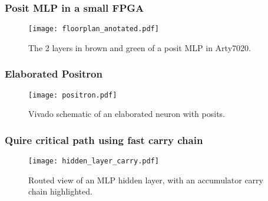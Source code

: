 \begin{frame}
    \frametitle{Posit MLP in a small FPGA}
    \begin{figure}[H]
        \centering
        \texttt{[image: floorplan\_anotated.pdf]}
        \caption{The 2 layers in brown and green of a posit MLP in Arty7020.}
    \end{figure}
\end{frame}

\begin{frame}
    \frametitle{Elaborated Positron}
    \begin{figure}[H]
        \centering
        \texttt{[image: positron.pdf]}
        \caption{Vivado schematic of an elaborated neuron with posits.}
    \end{figure}
\end{frame}

\begin{frame}
    \frametitle{Quire critical path using fast carry chain}
    \begin{figure}[H]
        \centering
        \texttt{[image: hidden\_layer\_carry.pdf]}
        \caption{Routed view of an MLP hidden layer, with an accumulator carry chain highlighted.}
    \end{figure}
\end{frame}

